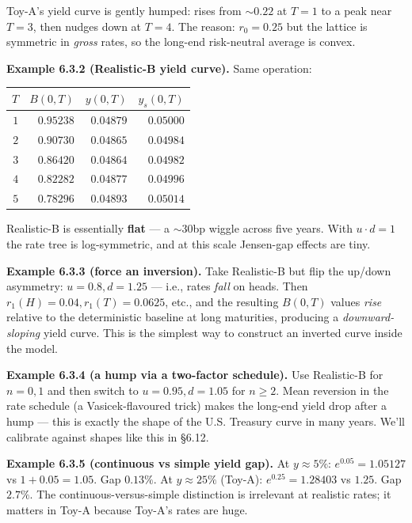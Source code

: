 \documentclass[
  10pt,
  twoside]{book}
\newcounter{none} %
\begin{document}
Toy-A's yield curve is gently humped: rises from \(\sim 0.22\) at
\(T=1\) to a peak near \(T=3\), then nudges down at \(T=4\). The reason:
\(r_0 = 0.25\) but the lattice is symmetric in \emph{gross} rates, so
the long-end risk-neutral average is convex.

\textbf{Example 6.3.2 (Realistic-B yield curve).} Same operation:

{\def\LTcaptype{none} %
\begin{table}[H]
\centering
\begin{tabular}{|r|r|r|r|}
\toprule
\(T\) & \(B(0, T)\) & \(y(0, T)\) & \(y_s(0, T)\) \\
\midrule



\(1\) & \(0.95238\) & \(0.04879\) & \(0.05000\) \\
\(2\) & \(0.90730\) & \(0.04865\) & \(0.04984\) \\
\(3\) & \(0.86420\) & \(0.04864\) & \(0.04982\) \\
\(4\) & \(0.82282\) & \(0.04877\) & \(0.04996\) \\
\(5\) & \(0.78296\) & \(0.04893\) & \(0.05014\) \\
\bottomrule
\end{tabular}
\end{table}
}

Realistic-B is essentially \textbf{flat} --- a \(\sim 30\)bp wiggle
across five years. With \(u \cdot d = 1\) the rate tree is
log-symmetric, and at this scale Jensen-gap effects are tiny.

\textbf{Example 6.3.3 (force an inversion).} Take Realistic-B but flip
the up/down asymmetry: \(u = 0.8, d = 1.25\) --- i.e., rates \emph{fall}
on heads. Then \(r_1(H) = 0.04, r_1(T) = 0.0625\), etc., and the
resulting \(B(0, T)\) values \emph{rise} relative to the deterministic
baseline at long maturities, producing a \emph{downward-sloping} yield
curve. This is the simplest way to construct an inverted curve inside
the model.

\textbf{Example 6.3.4 (a hump via a two-factor schedule).} Use
Realistic-B for \(n = 0, 1\) and then switch to \(u = 0.95, d = 1.05\)
for \(n \ge 2\). Mean reversion in the rate schedule (a
Vasicek-flavoured trick) makes the long-end yield drop after a hump ---
this is exactly the shape of the U.S. Treasury curve in many years.
We'll calibrate against shapes like this in §6.12.

\textbf{Example 6.3.5 (continuous vs simple yield gap).} At
\(y \approx 5\%\): \(e^{0.05} = 1.05127\) vs \(1 + 0.05 = 1.05\). Gap
\(0.13\%\). At \(y \approx 25\%\) (Toy-A): \(e^{0.25} = 1.28403\) vs
\(1.25\). Gap \(2.7\%\). The continuous-versus-simple distinction is
irrelevant at realistic rates; it matters in Toy-A because Toy-A's rates
are huge.
\end{document}
